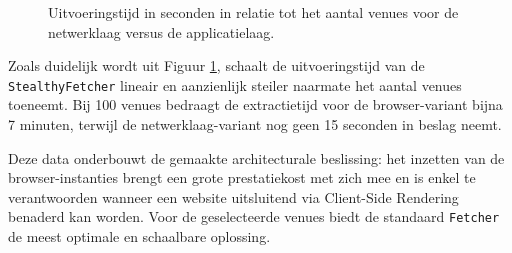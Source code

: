 \begin{figure}[h]
    \centering
    \caption{Uitvoeringstijd in seconden in relatie tot het aantal venues voor de netwerklaag versus de applicatielaag.}
    \label{fig:fetcher-benchmark}
\end{figure}

Zoals duidelijk wordt uit Figuur \ref{fig:fetcher-benchmark}, schaalt de 
uitvoeringstijd van de \texttt{StealthyFetcher} lineair en aanzienlijk 
steiler naarmate het aantal venues toeneemt. Bij 100 venues bedraagt de 
extractietijd voor de browser-variant bijna 7 minuten, terwijl de netwerklaag-variant nog geen 15 seconden in beslag neemt. 

Deze data onderbouwt de gemaakte architecturale beslissing: 
het inzetten van de browser-instanties brengt een grote prestatiekost 
met zich mee en is enkel te verantwoorden wanneer een website uitsluitend via 
Client-Side Rendering benaderd kan worden. Voor de geselecteerde venues 
biedt de standaard \texttt{Fetcher} de meest optimale en schaalbare oplossing.

